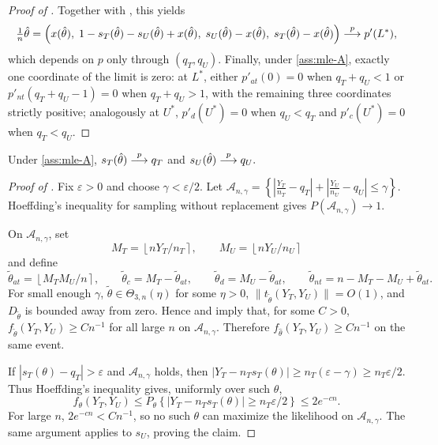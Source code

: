 \documentclass[12pt,reqno]{amsart}
\begin{document}
\begin{proof}[Proof of ]
Together with , this yields
\[
\tfrac{1}{n}\hat\theta
=
\left(x(\hat\theta),\; 1 - s_T(\hat\theta) - s_U(\hat\theta) + x(\hat\theta),\; s_U(\hat\theta) - x(\hat\theta),\; s_T(\hat\theta) - x(\hat\theta)\right)
\overset{p}{\longrightarrow}
p'(L^*),
\]
which depends on \(p\) only through \((q_T,q_U)\).
Finally, under \eqref{ass:mle-A}, exactly one coordinate of the limit is zero: at \(L^*\), either \(p'_{at}(0)=0\) when \(q_T+q_U<1\) or \(p'_{nt}(q_T{+}q_U{-}1)=0\) when \(q_T+q_U>1\), with the remaining three coordinates strictly positive; analogously at \(U^*\), \(p'_d(U^*)=0\) when \(q_U<q_T\) and \(p'_c(U^*)=0\) when \(q_T<q_U\).
\end{proof}

\begin{lem}\label{lem:mle-margin-consistency}
Under \eqref{ass:mle-A},
$
s_T(\hat\theta)\overset{p}{\longrightarrow} q_T$ and $
s_U(\hat\theta)\overset{p}{\longrightarrow} q_U.
$
\end{lem}

\begin{proof}[Proof of ]
Fix \(\varepsilon>0\) and choose \(\gamma<\varepsilon/2\).  Let
\(
\mathcal A_{n,\gamma}
=
\left\{
\left|\frac{Y_T}{n_T}-q_T\right|
+
\left|\frac{Y_U}{n_U}-q_U\right|
\le \gamma
\right\}.
\)
Hoeffding's inequality for sampling without replacement gives
\(P(\mathcal A_{n,\gamma})\to1\).

On \(\mathcal A_{n,\gamma}\), set
\[
M_T=\left\lfloor nY_T/n_T\right\rceil,\qquad
M_U=\left\lfloor nY_U/n_U\right\rceil
\]
and define
\[
\tilde\theta_{at}=\left\lfloor M_TM_U/n\right\rceil,\qquad
\tilde\theta_c=M_T-\tilde\theta_{at},\qquad
\tilde\theta_d=M_U-\tilde\theta_{at},
\qquad
\tilde\theta_{nt}=n-M_T-M_U+\tilde\theta_{at}.
\]
For small enough \(\gamma\), \(\tilde\theta\in\Theta_{3,n}(\eta)\) for some
\(\eta>0\), \(\|t_{\tilde\theta}(Y_T,Y_U)\|=O(1)\), and
\(D_{\tilde\theta}\) is bounded away from zero.  Hence
 and  imply that, for some
\(C>0\),
\(
f_{\tilde\theta}(Y_T,Y_U)\ge Cn^{-1}
\)
for all large \(n\) on \(\mathcal A_{n,\gamma}\).  Therefore
\(f_{\hat\theta}(Y_T,Y_U)\ge Cn^{-1}\) on the same event.

If \(|s_T(\theta)-q_T|>\varepsilon\) and \(\mathcal A_{n,\gamma}\) holds, then
\(
\left|Y_T-n_Ts_T(\theta)\right|\ge n_T(\varepsilon-\gamma)\ge n_T\varepsilon/2.
\)
Thus Hoeffding's inequality gives, uniformly over such \(\theta\),
\[
f_\theta(Y_T,Y_U)
\le
P_\theta\left\{|Y_T-n_Ts_T(\theta)|\ge n_T\varepsilon/2\right\}
\le 2e^{-cn}.
\]
For large \(n\), \(2e^{-cn}<Cn^{-1}\), so no such \(\theta\) can maximize the
likelihood on \(\mathcal A_{n,\gamma}\).  The same argument applies to
\(s_U\), proving the claim.
\end{proof}
\end{document}
